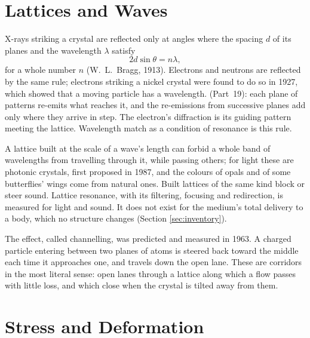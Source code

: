 \documentclass[11pt,a4paper]{article}
\begin{document}
\section{Lattices and Waves}
\label{sec:waves}

 X-rays striking a crystal are reflected only at angles where the spacing $d$ of its planes and the wavelength $\lambda$ satisfy
\begin{equation}
2d\sin\theta = n\lambda,
\label{eq:bragg}
\end{equation}
for a whole number $n$ (W.~L.~Bragg, 1913). Electrons and neutrons are reflected by the same rule; electrons striking a nickel crystal were found to do so in 1927, which showed that a moving particle has a wavelength.  (Part~19): each plane of patterns re-emits what reaches it, and the re-emissions from successive planes add only where they arrive in step. The electron's diffraction is its guiding pattern meeting the lattice. Wavelength match as a condition of resonance is this rule.

 A lattice built at the scale of a wave's length can forbid a whole band of wavelengths from travelling through it, while passing others; for light these are photonic crystals, first proposed in 1987, and the colours of opals and of some butterflies' wings come from natural ones. Built lattices of the same kind block or steer sound. Lattice resonance, with its filtering, focusing and redirection, is measured for light and sound. It does not exist for the medium's total delivery to a body, which no structure changes (Section \ref{sec:inventory}).

 The effect, called channelling, was predicted and measured in 1963. A charged particle entering between two planes of atoms is steered back toward the middle each time it approaches one, and travels down the open lane. These are corridors in the most literal sense: open lanes through a lattice along which a flow passes with little loss, and which close when the crystal is tilted away from them.

\section{Stress and Deformation}
\label{sec:stress}
\end{document}
